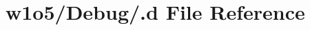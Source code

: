 \hypertarget{w1o5_2_debug_2_8d}{}\section{w1o5/\+Debug/.d File Reference}
\label{w1o5_2_debug_2_8d}
